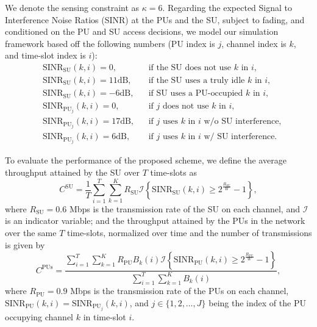 \documentclass[10pt, twocolumn]{IEEEtran}
\begin{document}
We denote the sensing constraint as $\kappa{=}6$. Regarding the expected Signal to Interference Noise Ratios (SINR) at the PUs and the SU, subject to fading, and conditioned on the PU and SU access decisions, we model our simulation framework based off the following numbers (PU index is $j$, channel index is $k$, and time-slot index is $i$):
\begin{align*}
    &\text{SINR}_{\text{SU}}(k,i){=}0,&&\text{if the SU does not use $k$ in $i$,}\\
    &\text{SINR}_{\text{SU}}(k,i){=}11\text{dB},&&\text{if the SU uses a truly idle $k$ in $i$,}\\
    &\text{SINR}_{\text{SU}}(k,i){=}{-}6\text{dB},&&\text{if SU uses a PU-occupied $k$ in $i$,}\\
    &\text{SINR}_{\text{PU}_{j}}(k,i){=}0,&&\text{if $j$ does not use $k$ in $i$,}\\
    &\text{SINR}_{\text{PU}_{j}}(k,i){=}17\text{dB},&&\text{if $j$ uses $k$ in $i$ w/o SU interference,}\\
    &\text{SINR}_{\text{PU}_{j}}(k,i){=}6\text{dB},&&\text{if $j$ uses $k$ in $i$ w/ SU interference.}
\end{align*}

To evaluate the performance of the proposed scheme, we define the average throughput attained by the SU over $T$ time-slots as
\begin{equation}\label{30}
    C^{\text{SU}}=\frac{1}{T}\sum_{i=1}^{T}\sum_{k=1}^{K}R_{\text{SU}}\mathcal{I}\left\{\text{SINR}_{\text{SU}}(k,i) \geq 2^{\frac{R_{\text{SU}}}{W}}-1\right\},
\end{equation}
where $R_{\text{SU}}{=}0.6$ Mbps is the transmission rate of the SU on each channel, and $\mathcal{I}$ is an indicator variable; and the throughput attained by the PUs in the network over the same $T$ time-slots, normalized over time and the number of transmissions is given by
\begin{equation}\label{31}
    C^{\text{PUs}}{=}\frac{\sum_{i=1}^{T}\sum_{k=1}^{K}R_{\text{PU}}B_{k}(i)\mathcal{I}\left\{\text{SINR}_{\text{PU}}(k,i){\geq}2^{\frac{R_{\text{PU}}}{W}}-1\right\}}{\sum_{i=1}^{T}\sum_{k=1}^{K}B_{k}(i)},
\end{equation}
where $R_{\text{PU}}{=}0.9$ Mbps is the transmission rate of the PUs on each channel, $\text{SINR}_{\text{PU}}(k,i)=\text{SINR}_{\text{PU}_{j}}(k,i)$, and $j{\in}\{1,2,\dots,J\}$ being the index of the PU occupying channel $k$ in time-slot $i$.
\end{document}
